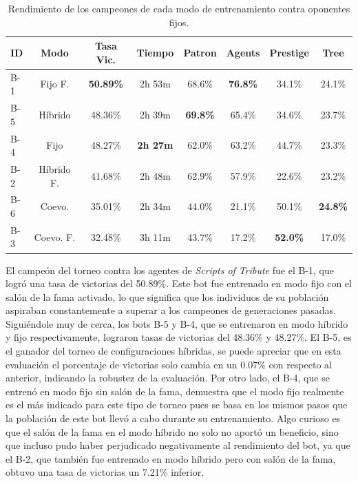 \begin{table}[H]
	\centering
	\caption{Rendimiento de los campeones de cada modo de entrenamiento contra oponentes fijos.}
	\label{tab:resultados_exp_modos}
	\small
	\begin{tabular}{@{}lccccccc@{}}
		\toprule
		\textbf{ID} & \textbf{Modo} & \textbf{Tasa Vic.} & \textbf{Tiempo} & \textbf{Patron} & \textbf{Agents} & \textbf{Prestige} & \textbf{Tree}   \\
		\midrule
		B-1         & Fijo F.       & \textbf{50.89\%}   & 2h 53m          & 68.6\%          & \textbf{76.8\%} & 34.1\%            & 24.1\%          \\
		B-5         & Híbrido       & 48.36\%            & 2h 39m          & \textbf{69.8\%} & 65.4\%          & 34.6\%            & 23.7\%          \\
		B-4         & Fijo          & 48.27\%            & \textbf{2h 27m} & 62.0\%          & 63.2\%          & 44.7\%            & 23.3\%          \\
		B-2         & Híbrido  F.   & 41.68\%            & 2h 48m          & 62.9\%          & 57.9\%          & 22.6\%            & 23.2\%          \\
		B-6         & Coevo.        & 35.01\%            & 2h 34m          & 44.0\%          & 21.1\%          & 50.1\%            & \textbf{24.8\%} \\
		B-3         & Coevo. F.     & 32.48\%            & 3h 11m          & 43.7\%          & 17.2\%          & \textbf{52.0\%}   & 17.0\%          \\
		\bottomrule
	\end{tabular}
\end{table}


El campeón del torneo contra los agentes de \textit{Scripts of Tribute} fue el B-1, que logró una tasa de victorias del 50.89\%. Este bot fue entrenado en modo fijo con el salón de la fama activado, lo que significa que los individuos de su población aspiraban constantemente a superar a los campeones de generaciones pasadas. Siguiéndole muy de cerca, los bots B-5 y B-4, que se entrenaron en modo híbrido y fijo respectivamente, lograron tasas de victorias del 48.36\% y 48.27\%. El B-5, es el ganador del torneo de configuraciones híbridas, se puede apreciar que en esta evaluación el porcentaje de victorias solo cambia en un 0.07\% con respecto al anterior, indicando la robustez de la evaluación. Por otro lado, el B-4, que se entrenó en modo fijo sin salón de la fama, demuestra que el modo fijo realmente es el más indicado para este tipo de torneo pues se basa en los mismos pasos que la población de este bot llevó a cabo durante su entrenamiento. Algo curioso es que el salón de la fama en el modo híbrido no solo no aportó un beneficio, sino que incluso pudo haber perjudicado negativamente al rendimiento del bot, ya que el B-2, que también fue entrenado en modo híbrido pero con salón de la fama, obtuvo una tasa de victorias un 7.21\% inferior.

